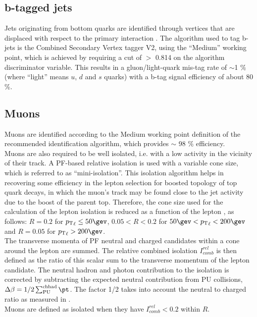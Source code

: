   

\subsection{b-tagged jets}
\label{sec:btags}
Jets originating from bottom quarks are identified through vertices that are displaced with respect to the primary interaction \cite{b-tagging}. The algorithm used to tag b-jets is the Combined Secondary Vertex tagger V2, using the ``Medium'' working point, which is achieved by requiring a cut of $>$ 0.814 on the algorithm discriminator variable. 
This results in a gluon/light-quark mis-tag rate of $\sim$1 \% (where ``light'' means $u$, $d$ and $s$ quarks) with a b-tag signal efficiency of about 80 \%. 



\subsection{Muons}
\label{sec:muon-id}
Muons are identified according to the Medium working point definition of the recommended identification algorithm, which provides $\sim$ 98 $\%$ efficiency. \\
Muons are also required to be well isolated, i.e. with a low activity in the vicinity of their track. 
A PF-based relative isolation is used with a variable cone size, which is referred to as ``mini-isolation''.
This isolation algorithm helps in recovering some efficiency in the lepton selection for boosted topology of top quark decays, 
in which the muon's track may be found close to the jet activity due to the boost of the parent top. 
Therefore, the cone size used for the calculation of the lepton isolation is reduced as a function of 
the lepton \Pt, as follows: $R=0.2$ for $\Pt_{\ell}\leq50\gev$, $0.05<R<0.2$ for $50 \gev < \Pt_{\ell} < 200\gev$ and $R=0.05$ for $\Pt_{\ell} > 200 \gev$. \\
The transverse momenta of PF neutral and charged candidates within a cone around the lepton are summed. 
The relative combined isolation $I^{rel}_{comb}$ is then defined as 
the ratio of this scalar sum to the transverse momentum of the lepton candidate. 
The neutral hadron and photon contribution to the isolation is corrected 
by subtracting the expected neutral contribution from PU collisions, $\Delta\beta=1/2\sum_{\mathrm{PU}}^{\mathrm{ch had}}{\pt}$. 
The factor 1/2 takes into account the neutral to charged ratio as measured in \cite{CMS-PFT-10-002}. \\
Muons are defined as isolated when they have $I^{rel}_{comb} < 0.2$ within $R$.

